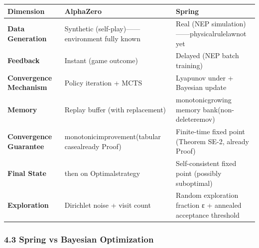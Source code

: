 \documentclass[
  12pt,
]{article}
\begin{document}
\begin{longtable}[]{@{}
  >{\raggedright\arraybackslash}p{}
  >{\raggedright\arraybackslash}p{}
  >{\raggedright\arraybackslash}p{}@{}}
\toprule\noalign{}
\begin{minipage}[b]{\linewidth}\raggedright
Dimension
\end{minipage} & \begin{minipage}[b]{\linewidth}\raggedright
AlphaZero
\end{minipage} & \begin{minipage}[b]{\linewidth}\raggedright
Spring
\end{minipage} \\
\midrule\noalign{}
\endhead
\bottomrule\noalign{}
\endlastfoot
\textbf{Data Generation} & Synthetic (self-play)------environment fully known & Real (NEP
simulation)------physicalrulelawnot yet  \\
\textbf{Feedback} & Instant (game outcome) & Delayed (NEP batch training) \\
\textbf{Convergence Mechanism} & Policy iteration + MCTS & Lyapunov under  + Bayesian update \\
\textbf{Memory} & Replay buffer (with replacement) & monotonicgrowing memory bank(non-deleteremov) \\
\textbf{Convergence Guarantee} & monotonicimprovement(tabular casealready Proof) & Finite-time fixed point (Theorem
SE-2, already Proof) \\
\textbf{Final State} & then on Optimalstrategy  & Self-consistent fixed point (possibly suboptimal) \\
\textbf{Exploration} & Dirichlet noise + visit count & Random exploration fraction ε +
annealed acceptance threshold \\
\end{longtable}

\subsubsection{4.3 Spring vs
Bayesian Optimization}\label{spring-vs-ux8d1dux53f6ux65afux4f18ux5316}
\end{document}
